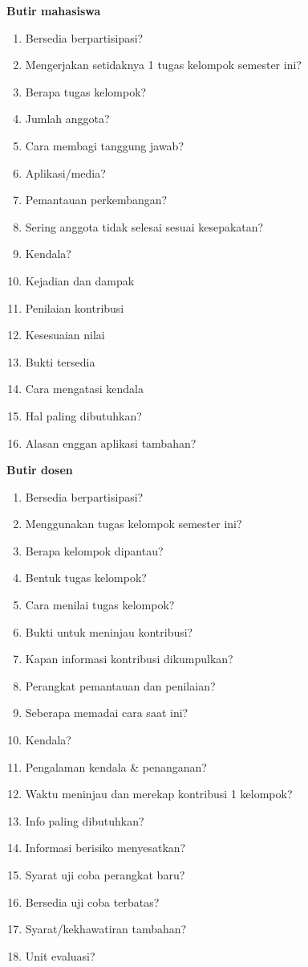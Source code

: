 \documentclass[12pt,a4paper,oneside]{report}
\begin{document}
\textbf{Butir mahasiswa}
\begin{enumerate}
\item Bersedia berpartisipasi?
\item Mengerjakan setidaknya 1 tugas kelompok semester ini?
\item Berapa tugas kelompok?
\item Jumlah anggota?
\item Cara membagi tanggung jawab?
\item Aplikasi/media?
\item Pemantauan perkembangan?
\item Sering anggota tidak selesai sesuai kesepakatan?
\item Kendala?
\item Kejadian dan dampak
\item Penilaian kontribusi
\item Kesesuaian nilai
\item Bukti tersedia
\item Cara mengatasi kendala
\item Hal paling dibutuhkan?
\item Alasan enggan aplikasi tambahan?
\end{enumerate}
\clearpage
\textbf{Butir dosen}
\begin{enumerate}
\item Bersedia berpartisipasi?
\item Menggunakan tugas kelompok semester ini?
\item Berapa kelompok dipantau?
\item Bentuk tugas kelompok?
\item Cara menilai tugas kelompok?
\item Bukti untuk meninjau kontribusi?
\item Kapan informasi kontribusi dikumpulkan?
\item Perangkat pemantauan dan penilaian?
\item Seberapa memadai cara saat ini?
\item Kendala?
\item Pengalaman kendala \& penanganan?
\item Waktu meninjau dan merekap kontribusi 1 kelompok?
\item Info paling dibutuhkan?
\item Informasi berisiko menyesatkan?
\item Syarat uji coba perangkat baru?
\item Bersedia uji coba terbatas?
\item Syarat/kekhawatiran tambahan?
\item Unit evaluasi?
\end{enumerate}
\end{document}
